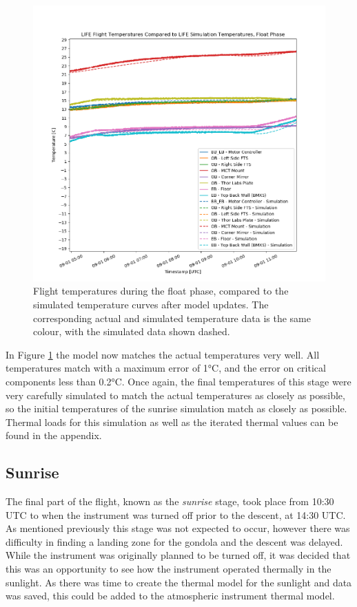 \begin{figure}
    \centering
    \includegraphics[width=\textwidth]{chap4_images/float_images/Float_temps_with_sims_V2.png}
    \caption{Flight temperatures during the float phase, compared to the simulated temperature curves after model updates. The corresponding actual and simulated temperature data is the same colour, with the simulated data shown dashed.}
    \label{fig:float_temps_with_sims}
\end{figure}

In Figure \ref{fig:float_temps_with_sims} the model now matches the actual temperatures very well. All temperatures match with a maximum error of 1°C, and the error on critical components less than 0.2°C. Once again, the final temperatures of this stage were very carefully simulated to match the actual temperatures as closely as possible, so the initial temperatures of the sunrise simulation match as closely as possible. Thermal loads for this simulation as well as the iterated thermal values can be found in the appendix.

\subsection{Sunrise}
The final part of the flight, known as the \textit{sunrise} stage, took place from 10:30 UTC to when the instrument was turned off prior to the descent, at 14:30 UTC. As mentioned previously this stage was not expected to occur, however there was difficulty in finding a landing zone for the gondola and the descent was delayed. While the instrument was originally planned to be turned off, it was decided that this was an opportunity to see how the instrument operated thermally in the sunlight. As there was time to create the thermal model for the sunlight and data was saved, this could be added to the atmospheric instrument thermal model.

